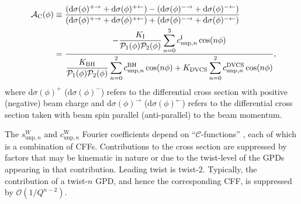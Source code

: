 \documentclass[11pt,a4paper]{article}
\begin{document}
\begin{align}
\hspace{0.5cm}\mathcal{A}_{\textrm{C}}(\phi) &\equiv  
\frac{(\textrm{d}\sigma(\phi)^{+\rightarrow} +
\textrm{d}\sigma(\phi)^{+\leftarrow}) -
(\textrm{d}\sigma(\phi)^{-\rightarrow}
+ \textrm{d}\sigma(\phi)^{-\leftarrow})}{(\textrm{d}\sigma(\phi)^{+\rightarrow}
+
\textrm{d}\sigma(\phi)^{+\leftarrow}) +
(\textrm{d}\sigma(\phi)^{-\rightarrow}
+ \textrm{d}\sigma(\phi)^{-\leftarrow})}&    \nonumber \\
&=\dfrac{{-\dfrac{K_{\textrm{I}}}{\mathcal{P}_{1}(\phi)\mathcal{P}_{2}(\phi)}
\displaystyle\sum_{n=0}^3
c_{\textrm{unp},n}^{\textrm{I}}\cos(n\phi)}}{\dfrac{K_{\textrm{BH}}}{\mathcal{P}_{1}
(\phi)\mathcal{P}_
{2}(\phi)}
\displaystyle\sum_{n=0}^2
c_{\textrm{unp},n}^{\textrm{BH}}\cos(n\phi) + 
K_{\textrm{DVCS}}\displaystyle\sum_{n=0}^2 c_{\textrm{unp},n}^{\textrm{DVCS}}\cos(n\phi)} ,&
\label{e:ac}
\end{align}
where $\textrm{d}\sigma(\phi)^+$ ($\textrm{d}\sigma(\phi)^-$) refers to
the differential cross section with positive (negative) beam charge and
$\textrm{d}\sigma(\phi)^\rightarrow$ ($\textrm{d}\sigma(\phi)^\leftarrow$) refers
to the differential cross section taken with beam spin parallel (anti-parallel) to the
beam momentum.

The $s_{\textrm{unp},n}^{W}$ and $c_{\textrm{unp},n}^{\textrm{W}}$ Fourier
coefficients depend on ``$\mathcal{C}$-functions'' \cite{Bel02b}, each of which is a
combination of CFFs. Contributions to the cross section are suppressed by factors that may be kinematic in nature or due to the twist-level of the GPDs appearing in that contribution. Leading twist is twist-2. Typically, the contribution of a twist-$n$ GPD, and hence the corresponding CFF, is
suppressed by $\mathcal{O}(1/Q^{n-2})$. 
\end{document}

